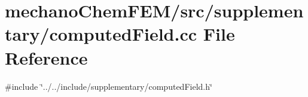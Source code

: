 \section{mechano\+Chem\+F\+E\+M/src/supplementary/computed\+Field.cc File Reference}
\label{computed_field_8cc}
{\ttfamily \#include \char`\"{}../../include/supplementary/computed\+Field.\+h\char`\"{}}\newline
